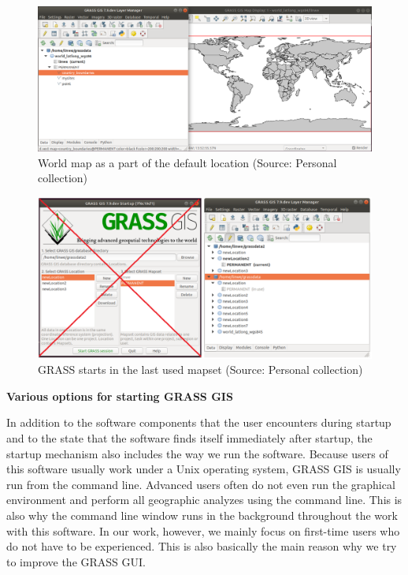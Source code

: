 \documentclass[a4paper,10pt,twoside]{article}
\begin{document}
\begin{enumerate}
\newpage
\vspace{0.3cm}
\begin{figure}[hbt!] 
\begin{center}
\includegraphics[width=16.5cm]{../pictures/demolocation.png} 
\caption[World map as a part of the default location]{World map as a part of the default location (Source: Personal collection)}
\label{fig:demolocation}
\end{center}
\end{figure}

\vspace{0.3cm}
\begin{figure}[hbt!] 
\begin{center}
\includegraphics[width=16.5cm]{../pictures/last_mapset_startup.png} 
\caption[GRASS starts in the last used mapset]{GRASS starts in the last used mapset (Source: Personal collection)}
\label{fig:last_mapset_startup}
\end{center}
\end{figure}

\end{enumerate}

\bigskip
\noindent \textbf {Various options for starting GRASS GIS}

\large \noindent In addition to the software components that the user encounters during startup and to the state that the software finds itself immediately after startup, the startup mechanism also includes the way we run the software. Because users of this software usually work under a Unix operating system, GRASS GIS is usually run from the command line. Advanced users often do not even run the graphical environment and perform all geographic analyzes using the command line. This is also why the command line window runs in the background throughout the work with this software. In our work, however, we mainly focus on first-time users who do not have to be experienced. This is also basically the main reason why we try to improve the GRASS GUI.
\end{document}
